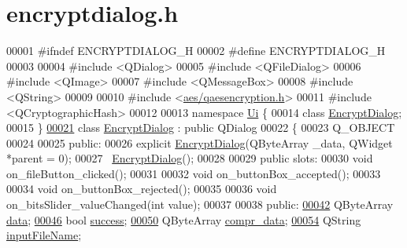 \hypertarget{encryptdialog_8h_source}{}\section{encryptdialog.\+h}

\begin{DoxyCode}
00001 \textcolor{preprocessor}{#ifndef ENCRYPTDIALOG\_H}
00002 \textcolor{preprocessor}{#define ENCRYPTDIALOG\_H}
00003 
00004 \textcolor{preprocessor}{#include <QDialog>}
00005 \textcolor{preprocessor}{#include <QFileDialog>}
00006 \textcolor{preprocessor}{#include <QImage>}
00007 \textcolor{preprocessor}{#include <QMessageBox>}
00008 \textcolor{preprocessor}{#include <QString>}
00009 
00010 \textcolor{preprocessor}{#include <\hyperlink{qaesencryption_8h}{aes/qaesencryption.h}>}
00011 \textcolor{preprocessor}{#include <QCryptographicHash>}
00012 
00013 \textcolor{keyword}{namespace }\hyperlink{namespace_ui}{Ui} \{
00014 \textcolor{keyword}{class }\hyperlink{class_encrypt_dialog}{EncryptDialog};
00015 \}
\hypertarget{encryptdialog_8h_source.tex_l00021}{}\hyperlink{class_encrypt_dialog}{00021} \textcolor{keyword}{class }\hyperlink{class_encrypt_dialog}{EncryptDialog} : \textcolor{keyword}{public} QDialog
00022 \{
00023     Q\_OBJECT
00024 
00025 \textcolor{keyword}{public}:
00026     \textcolor{keyword}{explicit} \hyperlink{class_encrypt_dialog}{EncryptDialog}(QByteArray \_data, QWidget *parent = 0);
00027     ~\hyperlink{class_encrypt_dialog}{EncryptDialog}();
00028 
00029 \textcolor{keyword}{public} slots:
00030     \textcolor{keywordtype}{void} on\_fileButton\_clicked();
00031 
00032     \textcolor{keywordtype}{void} on\_buttonBox\_accepted();
00033 
00034     \textcolor{keywordtype}{void} on\_buttonBox\_rejected();
00035 
00036     \textcolor{keywordtype}{void} on\_bitsSlider\_valueChanged(\textcolor{keywordtype}{int} value);
00037 
00038 \textcolor{keyword}{public}:
\hypertarget{encryptdialog_8h_source.tex_l00042}{}\hyperlink{class_encrypt_dialog_acf3a8bbce90d99ef17fec093c35b1008}{00042}     QByteArray \hyperlink{class_encrypt_dialog_acf3a8bbce90d99ef17fec093c35b1008}{data};
\hypertarget{encryptdialog_8h_source.tex_l00046}{}\hyperlink{class_encrypt_dialog_ada4900bcd40894d9c098c65aa4066ac9}{00046}     \textcolor{keywordtype}{bool} \hyperlink{class_encrypt_dialog_ada4900bcd40894d9c098c65aa4066ac9}{success};
\hypertarget{encryptdialog_8h_source.tex_l00050}{}\hyperlink{class_encrypt_dialog_a3e8998aa39696cbd1242f6420ef18143}{00050}     QByteArray \hyperlink{class_encrypt_dialog_a3e8998aa39696cbd1242f6420ef18143}{compr\_data};
\hypertarget{encryptdialog_8h_source.tex_l00054}{}\hyperlink{class_encrypt_dialog_a859b1bc2f032a247632b879bf8663d0b}{00054}     QString \hyperlink{class_encrypt_dialog_a859b1bc2f032a247632b879bf8663d0b}{inputFileName};

\end{DoxyCode}
